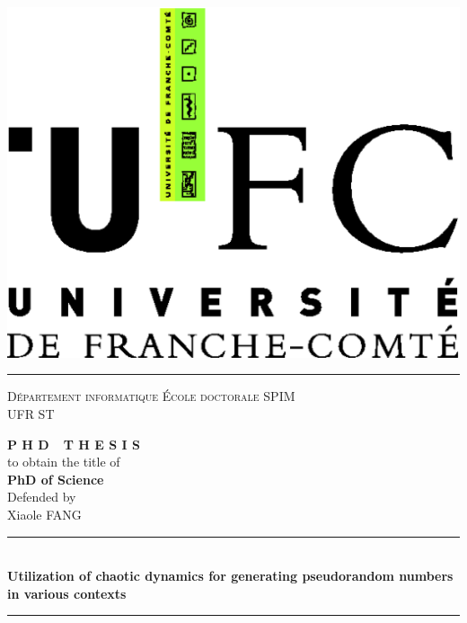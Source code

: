 \documentclass[french,book,nopubpage,nodocumentinfo]{upmethodology-document}
\newcommand{\HRule}{\rule{\linewidth}{0.5mm}}
\begin{document}
\begin{titlepage}




\vspace*{-4cm}

 \includegraphics[scale=0.2]{tluhp}
\hrule
\textsc{D\'epartement informatique
            \hfill\'Ecole doctorale SPIM\\UFR ST}\\
          
\begin{center}
\noindent \Huge \textbf{P H D\ \ T H E S I S} \\
\vspace*{0.3cm}
\noindent \large {to obtain the title of} \\
\vspace*{0.3cm}
\noindent \LARGE \textbf{PhD of Science} \\
\vspace*{0.3cm}
\noindent \large {Defended by\\}
\noindent \LARGE Xiaole \textsc{FANG} \\
%


\HRule \\[0.4cm]
{ \huge \bfseries Utilization of chaotic dynamics for generating pseudorandom numbers in various contexts}\\[0.4cm]

\HRule \\[1.5cm]


\end{center}
\end{titlepage}
\end{document}
